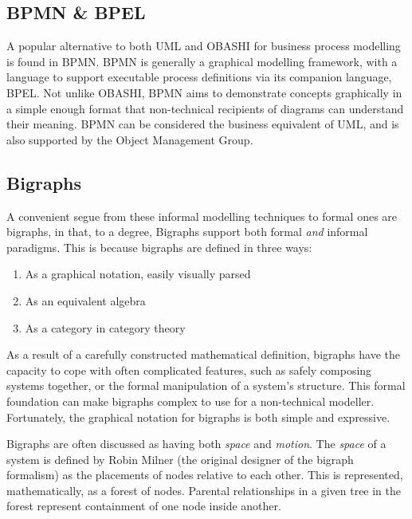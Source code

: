 \documentclass[draft]{article}
\begin{document}
\subsection{BPMN \& BPEL}
\label{subsec:bpmn}
A popular alternative to both UML and OBASHI for business process modelling is
found in BPMN\cite{bpmn_intro}. BPMN is generally a graphical modelling
framework, with a language to support executable process definitions via its
companion language, BPEL\cite{bpel_1.1_spec}. Not unlike OBASHI, BPMN aims to
demonstrate concepts graphically in a simple enough format that non-technical
recipients of diagrams can understand their meaning. BPMN can be considered the
business equivalent of UML, and is also supported by the Object Management
Group.\par


\subsection{Bigraphs}
\label{subsubsec:bigraphs}
A convenient segue from these informal modelling techniques to formal ones are
bigraphs, in that, to a degree, Bigraphs support both formal \emph{and} informal
paradigms. This is because bigraphs are defined in three ways:

\begin{enumerate}
\item As a graphical notation, easily visually parsed
\item As an equivalent algebra
\item As a category in category theory
\end{enumerate}

As a result of a carefully constructed mathematical definition, bigraphs have
the capacity to cope with often complicated features, such as safely composing
systems together, or the formal manipulation of a system's structure. This
formal foundation can make bigraphs complex to use for a non-technical
modeller. Fortunately, the graphical notation for bigraphs is both simple and
expressive.\par

Bigraphs are often discussed as having both \emph{space} and
\emph{motion}\cite{milner2009space}. The \emph{space} of a system is defined by
Robin Milner (the original designer of the bigraph formalism) as the placements
of nodes relative to each other. This is represented, mathematically, as a
forest of nodes. Parental relationships in a given tree in the forest represent
containment of one node inside another.\par
\end{document}
